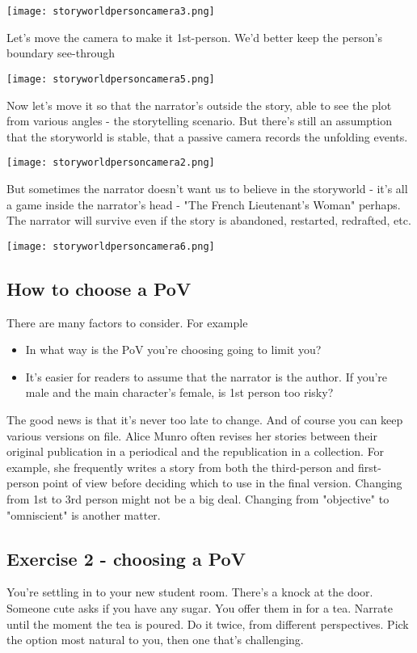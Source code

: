 \documentclass[11pt]{article}
\newenvironment{narrow}[2]{%
 \begin{list}{}{%
  \setlength{\topsep}{0pt}%
  \setlength{\leftmargin}{#1}%
  \setlength{\rightmargin}{#2}%
  \setlength{\listparindent}{\parindent}%
  \setlength{\itemindent}{\parindent}%
  \setlength{\parsep}{\parskip}%
 }%
\item[]}{\end{list}}
\begin{document}
\texttt{[image: storyworldpersoncamera3.png]}

Let's move the camera to make it 1st-person. We'd better keep the person's boundary see-through

\texttt{[image: storyworldpersoncamera5.png]}

Now let's move it so that the narrator's outside the story, able to see the plot from various angles - the storytelling scenario. But there's still an assumption that the storyworld is stable, that a passive camera records the unfolding events.

\texttt{[image: storyworldpersoncamera2.png]}

But sometimes the narrator doesn't want us to believe in the storyworld - it's all a game inside the narrator's head - "The French Lieutenant's Woman" perhaps. The narrator will survive even if the story is abandoned, restarted, redrafted, etc.

\texttt{[image: storyworldpersoncamera6.png]}

\subsection*{How to choose a PoV}
There are many factors to consider. For example


\begin{itemize}
\item In what way is the PoV you're choosing going to limit you? 
\item It's easier for readers to assume that the narrator is the author. If you're male and the main character's female, is 1st person too risky?
\end{itemize}
The good news is that it's never too late to change. And of course you can keep various versions on file. Alice Munro often revises her stories between their original publication in a periodical and the republication in a collection. For example, she frequently writes a story from both the third-person and first-person point of view before deciding which to use in the final version. Changing from 1st to 3rd person might not be a big deal. Changing from "objective" to "omniscient" is another matter.




\subsection*{Exercise 2 - choosing a PoV}
\begin{narrow}{1.0cm}{1.0cm}
You're settling in to your new student room. There's a knock at the door. 
Someone cute asks if you have any sugar. You offer them in for a tea. Narrate 
until the moment the tea is poured. Do it twice, from different perspectives. 
Pick the option most natural to you, then one that's challenging.
\end{narrow}
\end{document}
